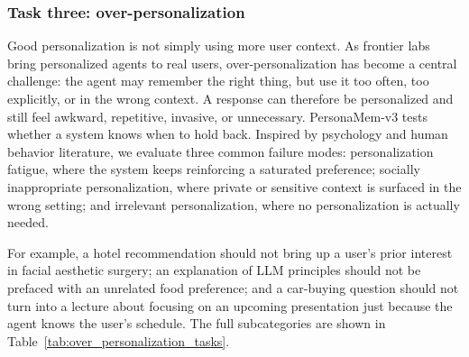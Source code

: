 \documentclass[]{fairmeta}
\begin{document}
\subsubsection{Task three: over-personalization}
Good personalization is not simply using more user context. As frontier labs bring personalized agents to real users, over-personalization has become a central challenge: the agent may remember the right thing, but use it too often, too explicitly, or in the wrong context. A response can therefore be personalized and still feel awkward, repetitive, invasive, or unnecessary. PersonaMem-v3 tests whether a system knows when to hold back. Inspired by psychology and human behavior literature, we evaluate three common failure modes: personalization fatigue, where the system keeps reinforcing a saturated preference; socially inappropriate personalization, where private or sensitive context is surfaced in the wrong setting; and irrelevant personalization, where no personalization is actually needed. 

For example, a hotel recommendation should not bring up a user's prior interest in facial aesthetic surgery; an explanation of LLM principles should not be prefaced with an unrelated food preference; and a car-buying question should not turn into a lecture about focusing on an upcoming presentation just because the agent knows the user's schedule. The full subcategories are shown in Table~\ref{tab:over_personalization_tasks}.
\end{document}
